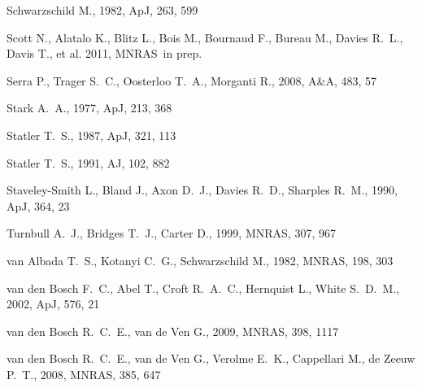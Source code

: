 \documentclass[usenatbib,usegraphicx]{mn2e}
\def\aj{AJ}             %
\def\apj{ApJ}           %
\def\aap{A\&A}          %
\def\mnras{MNRAS}       %
\begin{document}
\begin{thebibliography}{}
{Schwarzschild} M.,  1982, \apj, 263, 599

{Scott} N.,  {Alatalo} K.,  {Blitz} L.,  {Bois} M.,  {Bournaud} F.,  {Bureau}
  M.,  {Davies} R.~L.,  {Davis} T.,    {et al.} 2011, \mnras~in prep.

{Serra} P.,  {Trager} S.~C.,  {Oosterloo} T.~A.,    {Morganti} R.,  2008, \aap,
  483, 57

{Stark} A.~A.,  1977, \apj, 213, 368

{Statler} T.~S.,  1987, \apj, 321, 113

{Statler} T.~S.,  1991, \aj, 102, 882

{Staveley-Smith} L.,  {Bland} J.,  {Axon} D.~J.,  {Davies} R.~D.,    {Sharples}
  R.~M.,  1990, \apj, 364, 23

{Turnbull} A.~J.,  {Bridges} T.~J.,    {Carter} D.,  1999, \mnras, 307, 967

{van Albada} T.~S.,  {Kotanyi} C.~G.,    {Schwarzschild} M.,  1982, \mnras,
  198, 303

{van den Bosch} F.~C.,  {Abel} T.,  {Croft} R.~A.~C.,  {Hernquist} L.,
  {White} S.~D.~M.,  2002, \apj, 576, 21

{van den Bosch} R.~C.~E.,  {van de Ven} G.,  2009, \mnras, 398, 1117

{van den Bosch} R.~C.~E.,  {van de Ven} G.,  {Verolme} E.~K.,  {Cappellari} M.,
     {de Zeeuw} P.~T.,  2008, \mnras, 385, 647


\end{thebibliography}
\end{document}
